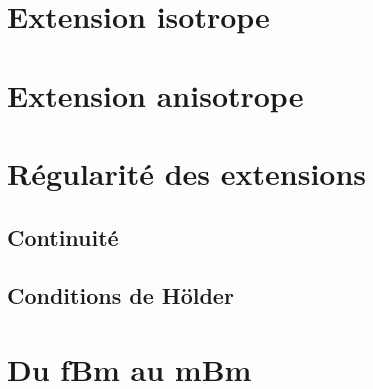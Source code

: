 
\section{Extension isotrope}
\section{Extension anisotrope}
\section{Régularité des extensions}
\subsection{Continuité}
\subsection{Conditions de Hölder}
\section{Du fBm au mBm}